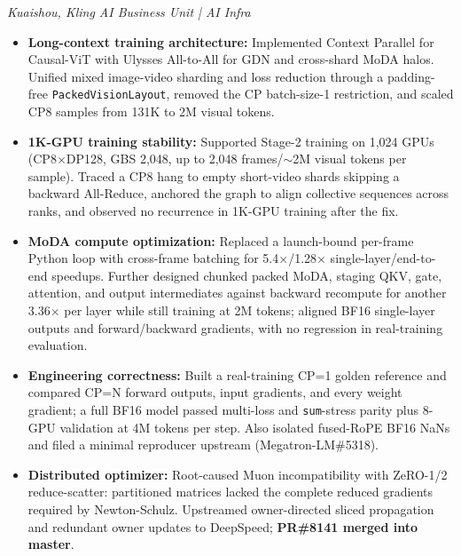 \documentclass{resume}
\begin{document}
{\small\itshape Kuaishou, Kling AI Business Unit | AI Infra\par}
\begin{itemize}[parsep=0.25ex]
  \item \textbf{Long-context training architecture:} Implemented Context Parallel for Causal-ViT with Ulysses All-to-All for GDN and cross-shard MoDA halos. Unified mixed image-video sharding and loss reduction through a padding-free \texttt{PackedVisionLayout}, removed the CP batch-size-1 restriction, and scaled CP8 samples from 131K to 2M visual tokens.
  \item \textbf{1K-GPU training stability:} Supported Stage-2 training on 1,024 GPUs (CP8$\times$DP128, GBS 2,048, up to 2,048 frames/$\sim$2M visual tokens per sample). Traced a CP8 hang to empty short-video shards skipping a backward All-Reduce, anchored the graph to align collective sequences across ranks, and observed no recurrence in 1K-GPU training after the fix.
  \item \textbf{MoDA compute optimization:} Replaced a launch-bound per-frame Python loop with cross-frame batching for 5.4$\times$/1.28$\times$ single-layer/end-to-end speedups. Further designed chunked packed MoDA, staging QKV, gate, attention, and output intermediates against backward recompute for another 3.36$\times$ per layer while still training at 2M tokens; aligned BF16 single-layer outputs and forward/backward gradients, with no regression in real-training evaluation.
  \item \textbf{Engineering correctness:} Built a real-training CP=1 golden reference and compared CP=N forward outputs, input gradients, and every weight gradient; a full BF16 model passed multi-loss and \texttt{sum}-stress parity plus 8-GPU validation at 4M tokens per step. Also isolated fused-RoPE BF16 NaNs and filed a minimal reproducer upstream (Megatron-LM\#5318).
  \item \textbf{Distributed optimizer:} Root-caused Muon incompatibility with ZeRO-1/2 reduce-scatter: partitioned matrices lacked the complete reduced gradients required by Newton-Schulz. Upstreamed owner-directed sliced propagation and redundant owner updates to DeepSpeed; \textbf{PR\#8141 merged into master}.
\end{itemize}
\end{document}
